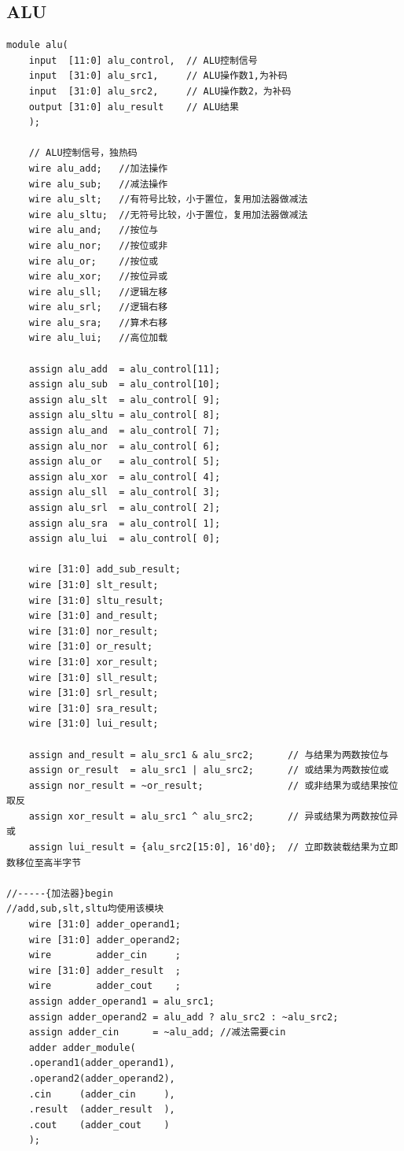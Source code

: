 \documentclass[AutoFakeBold]{LZUThesis}
\begin{document}
\subsection{ALU}
\begin{lstlisting}[style=verilog-style]
module alu(
    input  [11:0] alu_control,  // ALU控制信号
    input  [31:0] alu_src1,     // ALU操作数1,为补码
    input  [31:0] alu_src2,     // ALU操作数2，为补码
    output [31:0] alu_result    // ALU结果
    );

    // ALU控制信号，独热码
    wire alu_add;   //加法操作
    wire alu_sub;   //减法操作
    wire alu_slt;   //有符号比较，小于置位，复用加法器做减法
    wire alu_sltu;  //无符号比较，小于置位，复用加法器做减法
    wire alu_and;   //按位与
    wire alu_nor;   //按位或非
    wire alu_or;    //按位或
    wire alu_xor;   //按位异或
    wire alu_sll;   //逻辑左移
    wire alu_srl;   //逻辑右移
    wire alu_sra;   //算术右移
    wire alu_lui;   //高位加载

    assign alu_add  = alu_control[11];
    assign alu_sub  = alu_control[10];
    assign alu_slt  = alu_control[ 9];
    assign alu_sltu = alu_control[ 8];
    assign alu_and  = alu_control[ 7];
    assign alu_nor  = alu_control[ 6];
    assign alu_or   = alu_control[ 5];
    assign alu_xor  = alu_control[ 4];
    assign alu_sll  = alu_control[ 3];
    assign alu_srl  = alu_control[ 2];
    assign alu_sra  = alu_control[ 1];
    assign alu_lui  = alu_control[ 0];

    wire [31:0] add_sub_result;
    wire [31:0] slt_result;
    wire [31:0] sltu_result;
    wire [31:0] and_result;
    wire [31:0] nor_result;
    wire [31:0] or_result;
    wire [31:0] xor_result;
    wire [31:0] sll_result;
    wire [31:0] srl_result;
    wire [31:0] sra_result;
    wire [31:0] lui_result;

    assign and_result = alu_src1 & alu_src2;      // 与结果为两数按位与
    assign or_result  = alu_src1 | alu_src2;      // 或结果为两数按位或
    assign nor_result = ~or_result;               // 或非结果为或结果按位取反
    assign xor_result = alu_src1 ^ alu_src2;      // 异或结果为两数按位异或
    assign lui_result = {alu_src2[15:0], 16'd0};  // 立即数装载结果为立即数移位至高半字节

//-----{加法器}begin
//add,sub,slt,sltu均使用该模块
    wire [31:0] adder_operand1;
    wire [31:0] adder_operand2;
    wire        adder_cin     ;
    wire [31:0] adder_result  ;
    wire        adder_cout    ;
    assign adder_operand1 = alu_src1; 
    assign adder_operand2 = alu_add ? alu_src2 : ~alu_src2; 
    assign adder_cin      = ~alu_add; //减法需要cin 
    adder adder_module(
    .operand1(adder_operand1),
    .operand2(adder_operand2),
    .cin     (adder_cin     ),
    .result  (adder_result  ),
    .cout    (adder_cout    )
    );


\end{lstlisting}
\end{document}
